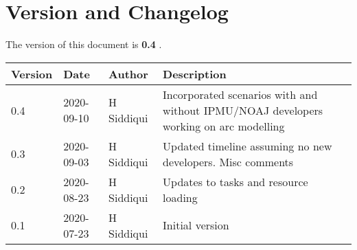 \section{Version and Changelog}

The version of this document is {\bf 0.4} .

\begin{table}[H]
    \begin{tabular}{|l|l|l|p{10cm}| }
    \hline
    {\bf Version} & {\bf Date} & {\bf Author} & {\bf Description} \\ \hline
    0.4 & 2020-09-10 & H Siddiqui & Incorporated scenarios with and without IPMU/NOAJ developers working on arc modelling\\ \hline
    0.3 & 2020-09-03 & H Siddiqui & Updated timeline assuming no new developers. Misc comments\\ \hline
    0.2 & 2020-08-23 & H Siddiqui & Updates to tasks and resource loading \\ \hline
    0.1 & 2020-07-23 & H Siddiqui & Initial version \\ \hline
    \end{tabular}
\end{table}

